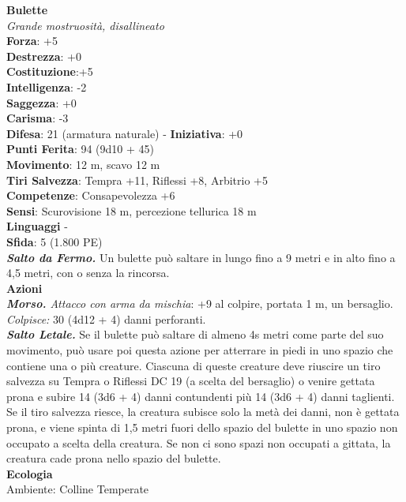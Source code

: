 \begin{multicols}{2}
\medskip\textbf{Bulette}\\
\emph{Grande mostruosità, disallineato}\\
\textbf{Forza}: +5\\
\textbf{Destrezza}: +0\\
\textbf{Costituzione}:+5\\
\textbf{Intelligenza}: -2\\
\textbf{Saggezza}: +0\\
\textbf{Carisma}: -3\\
\textbf{Difesa}: 21 (armatura naturale) - \textbf{Iniziativa}: +0\\
\textbf{Punti Ferita}: 94 (9d10 + 45)\\
\textbf{Movimento}: 12 m, scavo 12 m\\
\textbf{Tiri Salvezza}: Tempra +11, Riflessi +8, Arbitrio +5\\
\textbf{Competenze}: Consapevolezza +6\\
\textbf{Sensi}: Scurovisione 18 m, percezione tellurica 18 m\\
\textbf{Linguaggi} -\\
\textbf{Sfida}: 5 (1.800 PE)\smallskip\\
\emph{\textbf{Salto da Fermo.}} Un bulette può saltare in lungo fino a 9 metri e in alto fino a 4,5 metri, con o senza la rincorsa.\\
\smallskip\textbf{Azioni}\\
\emph{\textbf{Morso.} Attacco con arma da mischia}: +9 al colpire, portata 1 m, un bersaglio.\\
\emph{Colpisce:} 30 (4d12 + 4) danni perforanti.\\
\emph{\textbf{Salto Letale.}} Se il bulette può saltare di almeno 4s metri come parte del suo movimento, può usare poi questa azione per atterrare in piedi in uno spazio che contiene una o più creature. Ciascuna di queste creature deve riuscire un tiro salvezza su Tempra o Riflessi DC  19 (a scelta del bersaglio) o venire gettata prona e subire 14 (3d6 + 4) danni contundenti più 14 (3d6 + 4) danni taglienti. Se il tiro salvezza riesce, la creatura subisce solo la metà dei danni, non è gettata prona, e viene spinta di 1,5 metri fuori dello spazio del bulette in uno spazio non occupato a scelta della creatura. Se non ci sono spazi non occupati a gittata, la creatura cade prona nello spazio del bulette.\\
\textbf{Ecologia}\\
Ambiente: Colline Temperate\\

\end{multicols}
